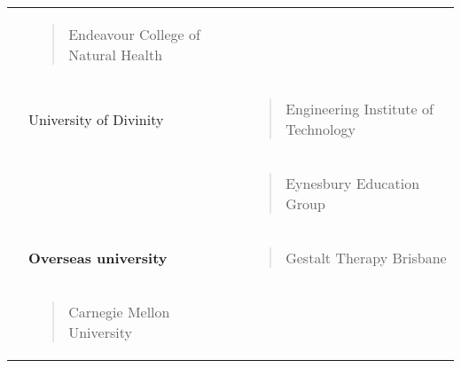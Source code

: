 \documentclass[]{book}
\begin{document}
\begin{longtable}[]{@{}lll@{}}
\begin{minipage}[t]{0.32\columnwidth}
\end{minipage} & \begin{minipage}[t]{0.32\columnwidth}\raggedright
\begin{quote}
Endeavour College of Natural Health
\end{quote}\strut
\end{minipage}\tabularnewline
\begin{minipage}[t]{0.32\columnwidth}\raggedright
\strut
\end{minipage} & \begin{minipage}[t]{0.32\columnwidth}\raggedright
University of Divinity\strut
\end{minipage} & \begin{minipage}[t]{0.32\columnwidth}\raggedright
\begin{quote}
Engineering Institute of Technology
\end{quote}\strut
\end{minipage}\tabularnewline
\begin{minipage}[t]{0.32\columnwidth}\raggedright
\strut
\end{minipage} & \begin{minipage}[t]{0.32\columnwidth}\raggedright
\strut
\end{minipage} & \begin{minipage}[t]{0.32\columnwidth}\raggedright
\begin{quote}
Eynesbury Education Group
\end{quote}\strut
\end{minipage}\tabularnewline
\begin{minipage}[t]{0.32\columnwidth}\raggedright
\strut
\end{minipage} & \begin{minipage}[t]{0.32\columnwidth}\raggedright
\textbf{Overseas university}\strut
\end{minipage} & \begin{minipage}[t]{0.32\columnwidth}\raggedright
\begin{quote}
Gestalt Therapy Brisbane
\end{quote}\strut
\end{minipage}\tabularnewline
\begin{minipage}[t]{0.32\columnwidth}\raggedright
\strut
\end{minipage} & \begin{minipage}[t]{0.32\columnwidth}\raggedright
\begin{quote}
Carnegie Mellon University
\end{quote}\strut

\end{minipage}
\end{longtable}
\end{document}
